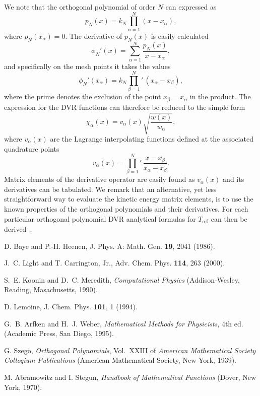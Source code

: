 \documentclass[onecolumn,letterpaper]{report}
\begin{document}
We note
that the orthogonal polynomial of order $N$ can expressed as
\begin{equation}
p_N(x)=k_N\prod_{\alpha=1}^{N}(x-x_{\alpha}),
\end{equation}
where $p_N(x_{\alpha})=0$. The derivative of $p_N(x)$ is easily
calculated 
\begin{equation}
\phi_N'(x)=\sum_{{\alpha}=1}^{N}\frac{p_N(x)}{x-x_{\alpha}},
\end{equation}
and specifically on the mesh points it takes the values
\begin{equation}
\phi_N'(x_{\alpha})=k_N{\prod_{\beta=1}^{N}}{}' \,
(x_{\alpha}-x_{\beta}), 
\end{equation}
where the prime denotes the exclusion of the point
$x_{\beta}=x_{\alpha}$ in the  
product. The expression for the DVR functions can therefore be reduced
to the simple form
\begin{equation}
\chi_{\alpha}(x)=v_{\alpha}(x)\sqrt{\frac{w(x)}{w_{\alpha}}},
\label{DVRfunc}
\end{equation}
where $v_{\alpha}(x)$ are the 
Lagrange interpolating functions defined at the associated quadrature
points 
\begin{equation}
v_{\alpha}(x)={\prod_{\beta=1}^{N}}{}' \,
\frac{x-x_{\beta}}{x_{\alpha}-x_{\beta}}. 
\end{equation}
Matrix elements of the derivative operator are easily found
as $v_{\alpha}(x)$ and its derivatives can be tabulated. We remark
that an alternative, yet less straightforward way to evaluate the
kinetic energy matrix elements, is to use the known properties of
the orthogonal polynomials and their derivatives. For each particular
orthogonal polynomial DVR analytical formulas for $T_{\alpha\beta}$
can then be derived~\cite{Baye1986}. 

\begin{thebibliography}{1}

D. Baye and P.-H. Heenen, J. Phys. A: Math. Gen. {\bf 19},  2041  (1986).

J.~C. Light and T. Carrington, Jr., Adv. Chem. Phys. {\bf 114},  263  (2000).

S.~E. Koonin and D.~C. Meredith, {\em Computational Physics} (Addison-Wesley,
  Reading, Masachusetts, 1990).

D. Lemoine, J. Chem. Phys. {\bf 101},  1  (1994).

G.~B. Arfken and H.~J. Weber, {\em Mathematical Methods for Physicists}, 4th
  ed. (Academic Press, San Diego, 1995).

G. Szeg\"o, {\em Orthogonal Polynomials}, Vol.~XXIII of {\em American
  Mathematical Society Colloqium Publications} (American Mathematical Society,
  New York, 1939).

M. Abramowitz and I. Stegun, {\em Handbook of Mathematical Functions} (Dover,
  New York, 1970).

\end{thebibliography}

\end{document}
